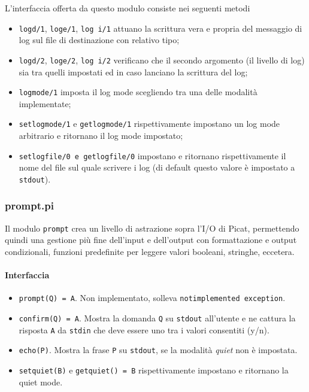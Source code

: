\documentclass[12pt,a4paper,openright]{book} %
\begin{document}
L'interfaccia offerta da questo modulo consiste nei seguenti metodi
\begin{itemize}
	\item \texttt{log\textunderscore d/1},
          \texttt{log\textunderscore e/1}, \texttt{log\textunderscore
            i/1} attuano la scrittura vera e propria del messaggio di
          log sul file di destinazione con relativo tipo;
	\item \texttt{log\textunderscore d/2},
          \texttt{log\textunderscore e/2}, \texttt{log\textunderscore
            i/2} verificano che il secondo argomento (il livello di
          log) sia tra quelli impostati ed in caso lanciano la
          scrittura del log;
	\item \texttt{log\textunderscore mode/1} imposta il log mode
          scegliendo tra una delle modalità implementate;
	\item \texttt{set\textunderscore log\textunderscore mode/1} e
          \texttt{get\textunderscore log\textunderscore mode/1}
          rispettivamente impostano un log mode arbitrario e ritornano
          il log mode impostato;
	\item \texttt{set\textunderscore log\textunderscore file/0 e
          get\textunderscore log\textunderscore file/0} impostano e
          ritornano rispettivamente il nome del file sul quale
          scrivere i log (di default questo valore è impostato a
          \texttt{stdout}).
\end{itemize}

\subsubsection{prompt.pi}

Il modulo \texttt{prompt} crea un livello di astrazione sopra l'I/O di
Picat, permettendo quindi una gestione più fine dell'input e
dell'output con formattazione e output condizionali, funzioni
predefinite per leggere valori booleani, stringhe, eccetera.

\paragraph{Interfaccia}

\begin{itemize}
	\item \texttt{prompt(Q) = A}. Non implementato, solleva
          \texttt{not\textunderscore implemented\textunderscore
            exception}.
	\item \texttt{confirm(Q) = A}. Mostra la domanda \texttt{Q} su
          \texttt{stdout} all'utente e ne cattura la risposta
          \texttt{A} da \texttt{stdin} che deve essere uno tra i
          valori consentiti (y/n).
	\item \texttt{echo(P)}. Mostra la frase \texttt{P} su
          \texttt{stdout}, se la modalità \emph{quiet} non è
          impostata.
	\item \texttt{set\textunderscore quiet(B)} e
          \texttt{get\textunderscore quiet() = B} rispettivamente
          impostano e ritornano la quiet mode.
\end{itemize}
\end{document}
